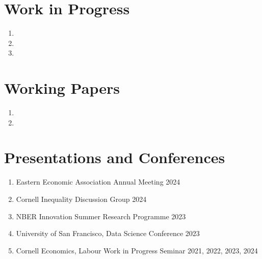 \documentclass[letterpaper,11pt,oneside]{article}
\begin{document}
\section*{Work in Progress}
\begin{enumerate}[itemsep=2.5pt, label={}]
    \item {}
    \item {}
    \item {}
\end{enumerate}


\section*{Working Papers}
\begin{enumerate}[itemsep=2.5pt, label={}]
    \item {}
    \item {}
\end{enumerate}


\section*{Presentations and Conferences}
\begin{enumerate}[itemsep=2pt, label={}]
    \item Eastern Economic Association Annual Meeting \hfill 2024
    \item Cornell Inequality Discussion Group \hfill 2024
    \item NBER Innovation Summer Research Programme \hfill 2023
    \item University of San Francisco, Data Science Conference \hfill 2023
    \item Cornell Economics, Labour Work in Progress Seminar \hfill 2021, 2022, 2023, 2024
\end{enumerate}
\end{document}
